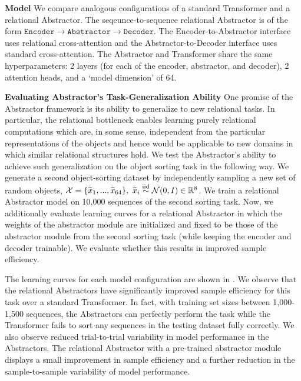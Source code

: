 \textbf{Model} We compare analogous configurations of a standard Transformer and a relational Abstractor. The seqeunce-to-sequence relational Abstractor is of the form $\texttt{Encoder} \to \texttt{Abstractor} \to \texttt{Decoder}$. The Encoder-to-Abstractor interface uses relational cross-attention and the Abstractor-to-Decoder interface uses standard cross-attention. The Abstractor and Transformer share the same hyperparameters: 2 layers (for each of the encoder, abstractor, and decoder), 2 attention heads, and a `model dimension' of 64.

\textbf{Evaluating Abstractor's Task-Generalization Ability} One promise of the Abstractor framework is its ability to generalize to new relational tasks. In particular, the relational bottleneck enables learning purely relational computations which are, in some sense, independent from the particular representations of the objects and hence would be applicable to new domains in which similar relational structures hold. We test the Abstractor's ability to achieve such generalization on the object sorting task in the following way. We generate a second object-sorting dataset by independently sampling a new set of random objects, $\mathcal{X} = \{ \widetilde{x}_1 , ..., \widetilde{x}_{64} \}, \ \widetilde{x}_i \overset{\mathrm{iid}}{\sim} \mathcal{N}(0, I) \in \mathbb{R}^8$. We train a relational Abstractor model on 10,000 sequences of the second sorting task. Now, we additionally evaluate learning curves for a relational Abstractor in which the weights of the abstractor module are initialized and fixed to be those of the abstractor module from the second sorting task (while keeping the encoder and decoder trainable). We evaluate whether this results in improved sample efficiency.

The learning curves for each model configuration are shown in . We observe that the relational Abstractors have significantly improved sample efficiency for this task over a standard Transformer. In fact, with training set sizes between 1,000-1,500 sequences, the Abstractors can perfectly perform the task while the Transformer fails to sort any sequences in the testing dataset fully correctly. We also observe reduced trial-to-trial variability in model performance in the Abstractors. The relational Abstractor with a pre-trained abstractor module displays a small improvement in sample efficiency and a further reduction in the sample-to-sample variability of model performance.

